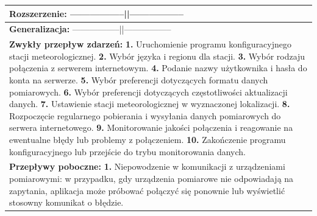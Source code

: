 \documentclass{article}
\begin{document}
\begin{center}
    \begin{center}
        \begin{tabular}{|l|l|l|}
        \hline
        \multicolumn{3}{|p{\dimexpr\linewidth-2\tabcolsep-2\arrayrulewidth}|}{\textbf{Rozszerzenie:} -----------------||-----------------} \\
        \hline
        \hline
        \multicolumn{3}{|p{\dimexpr\linewidth-2\tabcolsep-2\arrayrulewidth}|}{\textbf{Generalizacja:} -----------------||-----------------} \\
        \hline
        \hline
        \multicolumn{3}{|p{\dimexpr\linewidth-2\tabcolsep-2\arrayrulewidth}|}{\textbf{Zwykły przepływ zdarzeń:}
        \newline
        \textbf{1.} Uruchomienie programu konfiguracyjnego stacji meteorologicznej.
        \newline
        \textbf{2.} Wybór języka i regionu dla stacji.
        \newline
        \textbf{3.} Wybór rodzaju połączenia z serwerem internetowym.
        \newline
        \textbf{4.} Podanie nazwy użytkownika i hasła do konta na serwerze.
        \newline
        \textbf{5.} Wybór preferencji dotyczących formatu danych pomiarowych.
        \newline
        \textbf{6.} Wybór preferencji dotyczących częstotliwości aktualizacji danych.
        \newline
        \textbf{7.} Ustawienie stacji meteorologicznej w wyznaczonej lokalizacji.
        \newline
        \textbf{8.} Rozpoczęcie regularnego pobierania i wysyłania danych pomiarowych do serwera internetowego.
        \newline
        \textbf{9.} Monitorowanie jakości połączenia i reagowanie na ewentualne błędy lub problemy z połączeniem.
        \newline
        \textbf{10.} Zakończenie programu konfiguracyjnego lub przejście do trybu monitorowania danych.} \\
        \hline
        \hline
        \multicolumn{3}{|p{\dimexpr\linewidth-2\tabcolsep-2\arrayrulewidth}|}{\textbf{Przepływy poboczne:}
        \newline
        \textbf{1.} Niepowodzenie w komunikacji z urządzeniami pomiarowymi: w przypadku, gdy urządzenia pomiarowe nie odpowiadają na zapytania, aplikacja może próbować połączyć się ponownie lub wyświetlić stosowny komunikat o błędzie.
        \newline
}
\end{tabular}
\end{center}
\end{center}
\end{document}
